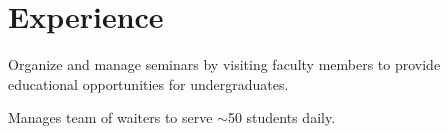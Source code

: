 \documentclass[letterpaper]{deedy-resume} %
\begin{document}
\begin{minipage}[t]{0.58\textwidth} %


\section{Experience}

\vspace{\topsep}
\begin{tightitemize}
\item Organize and manage seminars by visiting faculty members to provide educational opportunities for undergraduates.
\end{tightitemize}

\sectionspace

\vspace{\topsep}
\begin{tightitemize}
\item Manages team of waiters to serve $\sim$50 students daily.
\end{tightitemize}

\sectionspace









\end{minipage}
\end{document}
